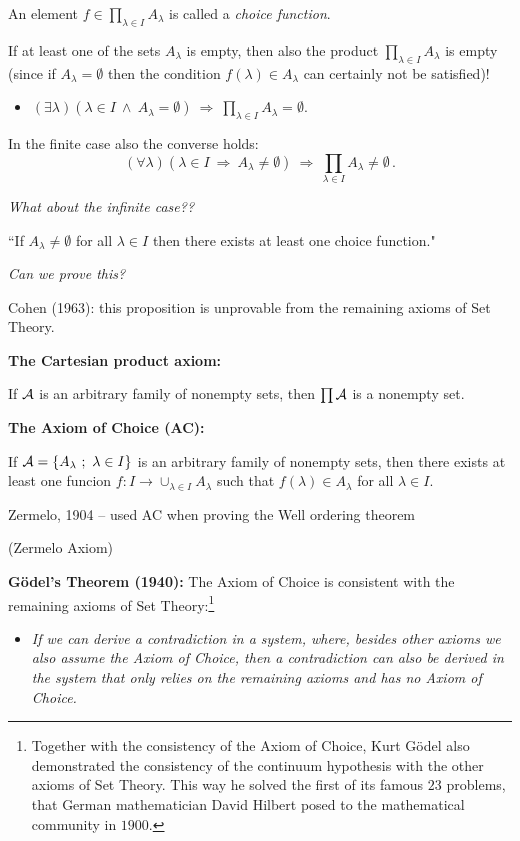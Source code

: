 \documentclass[11pt,paper=b5,footinclude,headinclude]{scrbook} %
\def\inn {{~\wedge~}}
\def\sledi {{~\Rightarrow~}}
\theoremstyle{remark}
\theoremstyle{definition} %
\theoremstyle{theorem} %
\begin{document}
An element
$f\in \prod_{\lambda\in I}A_\lambda$ is called a {\em choice function}.

If at least one of the sets $A_\lambda$ is empty, then also the product $\prod_{\lambda\in I}A_\lambda$
is empty (since if  $A_\lambda = \emptyset$ then the condition $f(\lambda) \in A_\lambda$ can certainly not be satisfied)!

\begin{itemize}
  \item $(\exists \lambda)(\lambda\in I\inn A_\lambda = \emptyset)\sledi \prod_{\lambda\in I}A_\lambda=\emptyset$.
\end{itemize}

In the finite case also the converse holds:
$$(\forall \lambda)(\lambda\in I\sledi A_\lambda\neq\emptyset)\sledi
      \prod_{\lambda\in I}A_\lambda\neq\emptyset\,.$$

{\em What about the infinite case??}

``If $A_\lambda\neq \emptyset$ for all $\lambda\in I$ then there exists at least one choice function."~

{\em Can we prove this?}

Cohen (1963): this proposition is unprovable from the remaining axioms of Set Theory.

\bigskip
\textbf{ The Cartesian product axiom:}

If ${\cal A}$ is an arbitrary family of nonempty sets, then $\prod {\cal A}$ is a nonempty set.

\bigskip
\textbf{ The Axiom of Choice (AC):}

If  ${\cal A} = \{A_\lambda~;~\lambda\in I\}$ is an arbitrary family of nonempty sets,
then there exists at least one funcion $f:I\to \cup_{\lambda \in I}A_\lambda$
such that
$f(\lambda)\in A_\lambda$ for all $\lambda\in I$.

Zermelo, 1904 -- used AC when proving the Well ordering theorem

(Zermelo Axiom)


\bigskip

\textbf{ G\"odel's Theorem (1940):} The Axiom of Choice is consistent with the remaining axioms of Set Theory:\footnote{Together with the consistency of the Axiom of Choice, Kurt G\"odel also demonstrated the consistency of the continuum hypothesis with the other axioms of Set Theory. This way he solved the first of its famous $23$ problems, that
German mathematician David Hilbert posed to the mathematical community in $1900$.}
\begin{itemize}
  \item \emph{ If we can derive a contradiction in a system, where, besides other axioms we also assume the Axiom of Choice, then a contradiction can also be derived in the system that only relies on the remaining axioms and has no Axiom of Choice.}
\end{itemize}
\end{document}
